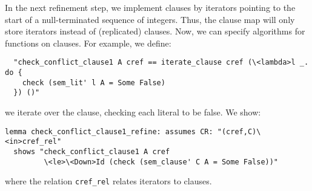 \documentclass{llncs}
\newcommand{\isai}{\lstinline[language=isabelle,basicstyle=\normalsize\ttfamily\slshape]}
\begin{document}
In the next refinement step, we implement clauses by iterators pointing to the start of a null-terminated sequence of integers.
Thus, the clause map will only store iterators instead of (replicated) clauses. 
Now, we can specify algorithms for functions on clauses. For example, we define:
\begin{lstlisting}
  "check_conflict_clause1 A cref == iterate_clause cref (\<lambda>l _. do {
    check (sem_lit' l A = Some False)
  }) ()"
\end{lstlisting}
\ie we iterate over the clause, checking each literal to be false. We show:
\begin{lstlisting}
lemma check_conflict_clause1_refine: assumes CR: "(cref,C)\<in>cref_rel"
  shows "check_conflict_clause1 A cref 
         \<le>\<Down>Id (check (sem_clause' C A = Some False))"
\end{lstlisting}
where the relation \isai{cref_rel} relates iterators to clauses.
\end{document}
